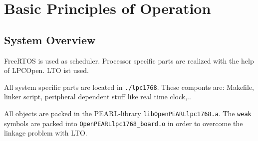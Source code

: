 \section{Basic Principles of Operation}

\subsection{System Overview}
FreeRTOS is used as scheduler. Processor specific parts are
realized with the help of LPCOpen. LTO ist used.

All system specific parts are located in \texttt{./lpc1768}. 
These componts are:
Makefile, linker script, peripheral dependent stuff like real time clock,..

All objects are packed in the PEARL-library 
\verb|libOpenPEARLlpc1768.a|. The \texttt{weak} symbols are
packed into \texttt{OpenPEARLlpc1768\_board.o} in order to overcome the 
linkage problem with LTO.

